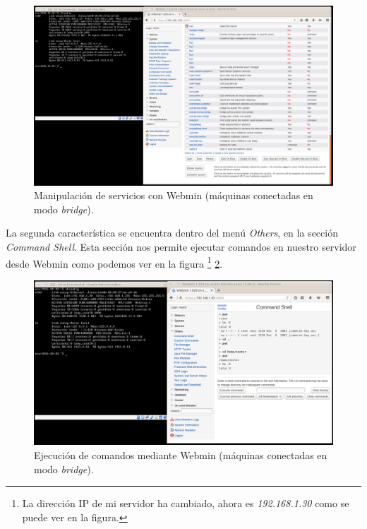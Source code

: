 \documentclass[a4paper,titlepage,12pt]{scrartcl}	%
\numberwithin{figure}{section} %
\numberwithin{table}{section} %
\begin{document}
	\begin{figure}[H]
		\centering
		\includegraphics[scale=0.23]{./Imagenes/12-pararssh.png}
		\caption[Manipulación de servicios con Webmin (máquinas conectadas en modo \textit{bridge}).]{Manipulación de servicios con Webmin (máquinas conectadas en modo \textit{bridge}).}
		\label{12-pararssh}
	\end{figure}
	
	La segunda característica se encuentra dentro del menú \textit{Others}, en la sección \textit{Command Shell}. Esta sección nos permite ejecutar comandos en nuestro servidor desde Webmin como podemos ver en la figura \footnote{La dirección IP de mi servidor ha cambiado, ahora es \textit{192.168.1.30} como se puede ver en la figura.} \ref{12-comandos}.
	
	\begin{figure}[H]
		\centering
		\includegraphics[scale=0.28]{./Imagenes/12-comandos.png}
		\caption[Ejecución de comandos mediante Webmin (máquinas conectadas en modo \textit{bridge}).]{Ejecución de comandos mediante Webmin (máquinas conectadas en modo \textit{bridge}).}
		\label{12-comandos}
	\end{figure}
	
\end{document}

